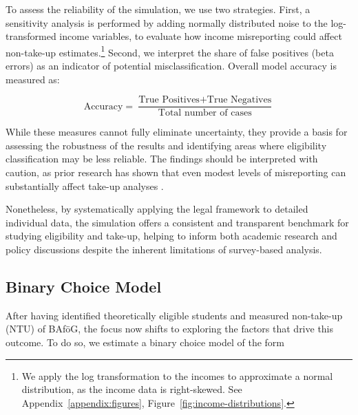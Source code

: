 To assess the reliability of the simulation, we use two strategies. First, a sensitivity analysis is performed by adding normally distributed noise to the log-transformed income variables, to evaluate how income misreporting could affect non-take-up estimates.\footnote{
We apply the log transformation to the incomes to approximate a normal distribution, as the income data is right-skewed. See Appendix~\ref{appendix:figures}, Figure~\ref{fig:income-distributions}.
}
Second, we interpret the share of false positives (beta errors) as an indicator of potential misclassification. Overall model accuracy is measured as:

\begin{equation} \label{eq:accuracy_microsimulation}
	\text{Accuracy} = \frac{\text{True Positives} + \text{True Negatives}}{\text{Total number of cases}}
\end{equation}

While these measures cannot fully eliminate uncertainty, they provide a basis for assessing the robustness of the results and identifying areas where eligibility classification may be less reliable. The findings should be interpreted with caution, as prior research has shown that even modest levels of misreporting can substantially affect take-up analyses \citep{pudney_impact_2001}. 

Nonetheless, by systematically applying the legal framework to detailed individual data, the simulation offers a consistent and transparent benchmark for studying eligibility and take-up, helping to inform both academic research and policy discussions despite the inherent limitations of survey-based analysis.




%
%
\subsection{Binary Choice Model}

After having identified theoretically eligible students and measured non-take-up (NTU) of BAföG, the focus now shifts to exploring the factors that drive this outcome. To do so, we estimate a binary choice model of the form

